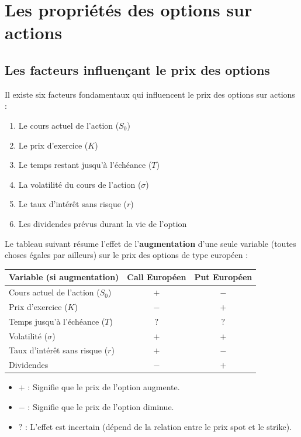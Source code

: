 \newpage

\section{Les propriétés des options sur actions}

\subsection{Les facteurs influençant le prix des options}

Il existe six facteurs fondamentaux qui influencent le prix des options sur actions :
\begin{enumerate}
    \item Le cours actuel de l'action ($S_0$)
    \item Le prix d'exercice ($K$)
    \item Le temps restant jusqu'à l'échéance ($T$)
    \item La volatilité du cours de l'action ($\sigma$)
    \item Le taux d'intérêt sans risque ($r$)
    \item Les dividendes prévus durant la vie de l'option
\end{enumerate}

Le tableau suivant résume l'effet de l'\textbf{augmentation} d'une seule variable (toutes choses égales par ailleurs) sur le prix des options de type européen :

\renewcommand{\arraystretch}{1.5}
\begin{tabular}{|l|c|c|}
\hline
\textbf{Variable (si augmentation)} & \textbf{Call Européen} & \textbf{Put Européen} \\
\hline
Cours actuel de l'action ($S_0$) & $+$ & $-$ \\
\hline
Prix d'exercice ($K$) & $-$ & $+$ \\
\hline
Temps jusqu'à l'échéance ($T$) & $?$ & $?$ \\
\hline
Volatilité ($\sigma$) & $+$ & $+$ \\
\hline
Taux d'intérêt sans risque ($r$) & $+$ & $-$ \\
\hline
Dividendes & $-$ & $+$ \\
\hline
\end{tabular}

\begin{remarquebox}[Légende]
\begin{itemize}
    \item $+$ : Signifie que le prix de l'option augmente.
    \item $-$ : Signifie que le prix de l'option diminue.
    \item $?$ : L'effet est incertain (dépend de la relation entre le prix spot et le strike).
\end{itemize}
\end{remarquebox}

